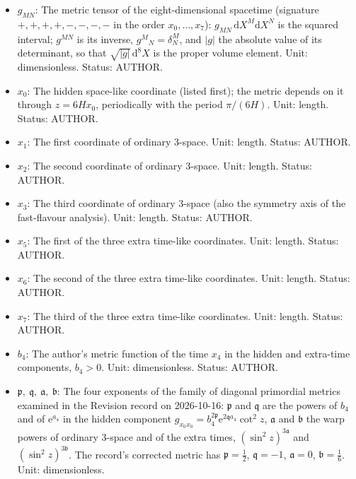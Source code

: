\documentclass[
  10pt,
]{article}
\providecommand{\tightlist}{%
  \setlength{\itemsep}{0pt}\setlength{\parskip}{0pt}}
\begin{document}
\begin{itemize}
\tightlist
\item
  \(g_{MN}\): The metric tensor of the eight-dimensional spacetime
  (signature \(+,+,+,+,-,-,-,-\) in the order \(x_0, \dots, x_7\)):
  \(g_{MN}\,\mathrm{d}X^M\mathrm{d}X^N\) is the squared interval;
  \(g^{MN}\) is its inverse, \(g^M{}_N = \delta^M_N\), and
  \(\lvert g\rvert\) the absolute value of its determinant, so that
  \(\sqrt{\lvert g\rvert}\,\mathrm{d}^8X\) is the proper volume element.
  Unit: dimensionless. Status: AUTHOR.
\item
  \(x_0\): The hidden space-like coordinate (listed first); the metric
  depends on it through \(z = 6Hx_0\), periodically with the period
  \(\pi/(6H)\). Unit: length. Status: AUTHOR.
\item
  \(x_1\): The first coordinate of ordinary 3-space. Unit: length.
  Status: AUTHOR.
\item
  \(x_2\): The second coordinate of ordinary 3-space. Unit: length.
  Status: AUTHOR.
\item
  \(x_3\): The third coordinate of ordinary 3-space (also the symmetry
  axis of the fast-flavour analysis). Unit: length. Status: AUTHOR.
\item
  \(x_5\): The first of the three extra time-like coordinates. Unit:
  length. Status: AUTHOR.
\item
  \(x_6\): The second of the three extra time-like coordinates. Unit:
  length. Status: AUTHOR.
\item
  \(x_7\): The third of the three extra time-like coordinates. Unit:
  length. Status: AUTHOR.
\item
  \(b_4\): The author's metric function of the time \(x_4\) in the
  hidden and extra-time components, \(b_4 > 0\). Unit: dimensionless.
  Status: AUTHOR.
\item
  \(\mathfrak{p},\ \mathfrak{q},\ \mathfrak{a},\ \mathfrak{b}\): The
  four exponents of the family of diagonal primordial metrics examined
  in the Revision record on 2026-10-16: \(\mathfrak{p}\) and
  \(\mathfrak{q}\) are the powers of \(b_4\) and of \(\mathrm{e}^{a_4}\)
  in the hidden component
  \(g_{x_0x_0} = b_4^{2\mathfrak{p}}\mathrm{e}^{2\mathfrak{q}a_4}\cot^2z\),
  \(\mathfrak{a}\) and \(\mathfrak{b}\) the warp powers of ordinary
  3-space and of the extra times, \((\sin^2z)^{3\mathfrak{a}}\) and
  \((\sin^2z)^{3\mathfrak{b}}\). The record's corrected metric has
  \(\mathfrak{p} = \frac12\), \(\mathfrak{q} = -1\),
  \(\mathfrak{a} = 0\), \(\mathfrak{b} = \frac16\). Unit: dimensionless.

\end{itemize}
\end{document}
